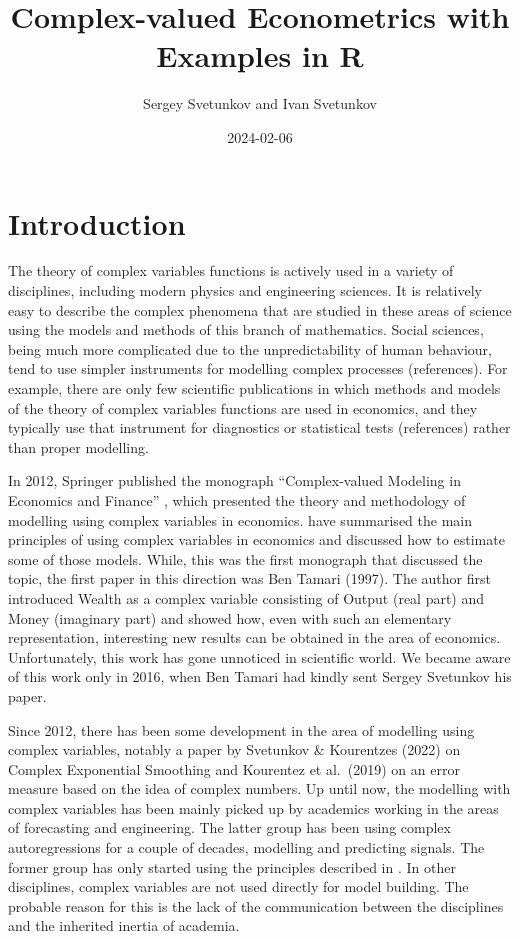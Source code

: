 \documentclass[
]{book}
\title{Complex-valued Econometrics with Examples in R}
\author{Sergey Svetunkov and Ivan Svetunkov}
\date{2024-02-06}
\begin{document}
\maketitle

{
\setcounter{tocdepth}{2}
\tableofcontents
}
\hypertarget{introduction}{%
\chapter*{Introduction}\label{introduction}}

The theory of complex variables functions is actively used in a variety of disciplines, including modern physics and engineering sciences. It is relatively easy to describe the complex phenomena that are studied in these areas of science using the models and methods of this branch of mathematics. Social sciences, being much more complicated due to the unpredictability of human behaviour, tend to use simpler instruments for modelling complex processes (references). For example, there are only few scientific publications in which methods and models of the theory of complex variables functions are used in economics, and they typically use that instrument for diagnostics or statistical tests (references) rather than proper modelling.

In 2012, Springer published the monograph ``Complex-valued Modeling in Economics and Finance'' \citep{Svetunkov2012}, which presented the theory and methodology of modelling using complex variables in economics. \citet{Svetunkov2012} have summarised the main principles of using complex variables in economics and discussed how to estimate some of those models. While, this was the first monograph that discussed the topic, the first paper in this direction was Ben Tamari (1997). The author first introduced Wealth as a complex variable consisting of Output (real part) and Money (imaginary part) and showed how, even with such an elementary representation, interesting new results can be obtained in the area of economics. Unfortunately, this work has gone unnoticed in scientific world. We became aware of this work only in 2016, when Ben Tamari had kindly sent Sergey Svetunkov his paper.

Since 2012, there has been some development in the area of modelling using complex variables, notably a paper by Svetunkov \& Kourentzes (2022) on Complex Exponential Smoothing and Kourentez et al.~(2019) on an error measure based on the idea of complex numbers. Up until now, the modelling with complex variables has been mainly picked up by academics working in the areas of forecasting and engineering. The latter group has been using complex autoregressions for a couple of decades, modelling and predicting signals. The former group has only started using the principles described in \citet{Svetunkov2012}. In other disciplines, complex variables are not used directly for model building. The probable reason for this is the lack of the communication between the disciplines and the inherited inertia of academia.
\end{document}
